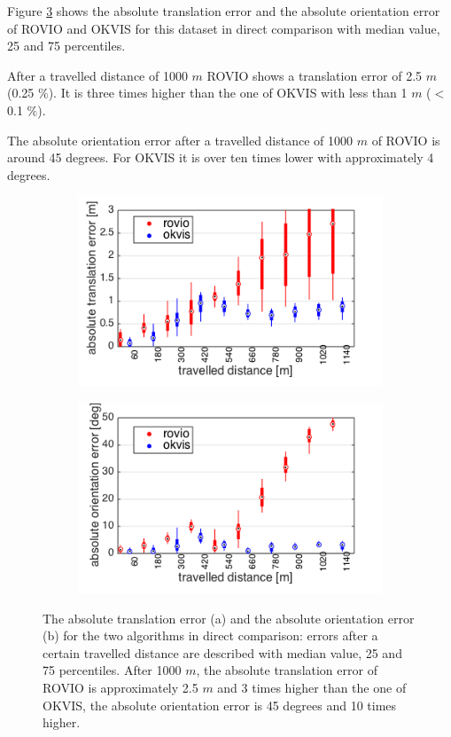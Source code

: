 Figure \ref{pics:ijrr_abs} shows the absolute translation error and the absolute orientation error of ROVIO and OKVIS for this dataset in direct comparison with median value, 25 and 75 percentiles.

After a travelled distance of 1000 $m$ ROVIO shows a translation error of 2.5 $m$ (0.25 $\%$). It is three times higher than the one of OKVIS with less than 1 $m$ ($<$0.1 $\%$). 

The absolute orientation error after a travelled distance of 1000 $m$ of ROVIO is around 45 degrees. For OKVIS it is over ten times lower with approximately 4 degrees. \\

\begin{figure}[h]
  \begin{subfigure}[b]{0.48\textwidth}
    \includegraphics[width=\textwidth]{images/ijrr/ate.png}
    \caption{}
    \label{fig:2}
  \end{subfigure}
  \hfill
  \begin{subfigure}[b]{0.48\textwidth}
    \includegraphics[width=\textwidth]{images/ijrr/aoe.png}
    \caption{}
    \label{fig:2}
  \end{subfigure}
   \caption{The absolute translation error (a) and the absolute orientation error (b) for the two algorithms in direct comparison: errors after a certain travelled distance are described with median value, 25 and 75 percentiles. After 1000 $m$, the absolute translation error of ROVIO is approximately 2.5 $m$ and 3 times higher than the one of OKVIS, the absolute orientation error is 45 degrees and 10 times higher.}
   \label{pics:ijrr_abs}
\end{figure}

